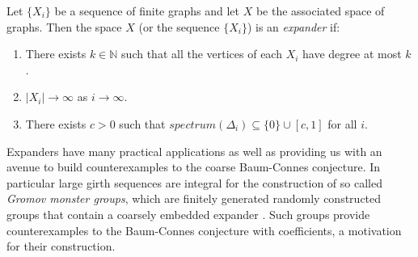 \begin{definition}
Let $\lbrace X_{i} \rbrace$ be a sequence of finite graphs and let $X$ be the associated space of graphs. Then the space $X$ (or the sequence $\lbrace X_{i} \rbrace$) is an \textit{expander} if:
\begin{enumerate}
\item There exists $k\in \mathbb{N}$ such that all the vertices of each $X_{i}$ have degree at most $k$.
\item $\vert X_{i} \vert \rightarrow \infty$ as $i\rightarrow \infty$.
\item There exists $c>0$ such that $spectrum(\Delta_{i})\subseteq \lbrace 0 \rbrace \cup [c,1]$ for all $i$.
\end{enumerate}
\end{definition}

Expanders have many practical applications as well as providing us with an avenue to build counterexamples to the coarse Baum-Connes conjecture. In particular large girth sequences are integral for the construction of so called \textit{Gromov monster groups}, which are finitely generated randomly constructed groups that contain a coarsely embedded expander \cite{MR1978492,exrangrps}. Such groups provide counterexamples to the Baum-Connes conjecture with coefficients, a motivation for their construction.

